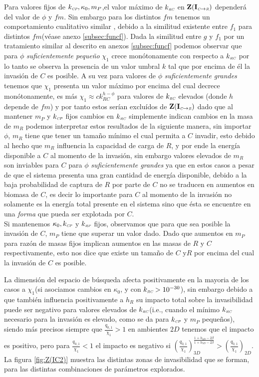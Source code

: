 Para valores fijos de $k_{\textit{\tiny CP}}, \kappa_0 ,m_P$,el valor m\'aximo de $k_{\textit{\tiny RC}}$ en $\mathbf{Z(I_{\textit{\tiny C}\to \textit{\tiny R}})}$ depender\'a del valor de $\phi$ y $fm$. Sin embargo para los distintos $fm$ tenemos un comportamiento cualitativo similar , debido a la similitud existente entre $f_1$ para distintos $fm$(v\'ease anexo \ref{subsec:funcf}). Dada la similitud entre $g$ y $f_1$ por un tratamiento similar al descrito en anexos \ref{subsec:funcf} podemos observar que para $\phi$ \emph{suficientemente peque\~no} $\chi_1$ crece mon\'otonamente con respecto a $k_{\textit{\tiny RC}}$ por lo tanto se observa la presencia de un valor umbral $k$ tal que por encima de \'el la invasi\'on de $C$ es posible. A su vez para valores de $\phi$ \emph{suficientemente grandes} tenemos que $\chi_1$ presenta un valor m\'aximo por encima del cual decrece mon\'otonamente, es m\'as $\chi_1 \approx c k_{RC}^{h - \phi}$ para valores de $k_{\textit{\tiny RC}}$ elevados (donde $h$ depende de $fm$) y por tanto estos ser\'ian exclu\'idos de $\mathbf{Z(I_{\textit{\tiny C}\to \textit{\tiny R}})}$ dado que al mantener $m_P$ y $k_{\textit{\tiny CP}}$ fijos cambios en $k_{\textit{\tiny RC}}$ simplemente indican cambios en la masa de $m_R$ podemos interpretar estos resultados de la siguiente manera, sin importar $\phi$, $m_R$ tiene que tener un tama\~no m\'inimo el cual permita a $C$ invadir, esto debido al hecho que $m_R$ influencia la capacidad de carga de $R$, y por ende la energ\'ia disponible a $C$ al momento de la invasi\'on, sin embargo valores elevados de $m_R$ son inviables para $C$ para $\phi$ \emph{suficientemente grandes} ya que en estos casos a pesar de que el sistema presenta una gran cantidad de energ\'ia disponible, debido a la baja probabilidad de captura de $R$ por parte de $C$ no se traducen en aumentos en biomasa de $C$, es decir lo importante para $C$ al momento de la invasi\'on no solamente es la energ\'ia total presente en el sistema sino que \'esta se encuentre en una \emph{forma} que pueda ser explotada por $C$.\\


Si mantenemos $\kappa_0,k_{\textit{\tiny CP}}$ y $k_{\textit{\tiny RP}}$ fijos, observamos que para que sea posible la invasi\'on de $C$, $m_P$ tiene que superar un valor dado. Dado que aumentos en $m_P$ para raz\'on de masas fijos implican aumentos en las masas de $R$ y $C$ respectivamente, esto nos dice que existe un tama\~no de $C$ y$R$ por encima del cual la invasi\'on de $C$ es posible.

La dimensi\'on del espacio de b\'usqueda afecta positivamente en la mayoria de los casos a $\chi_1$(si asociamos cambios en $\kappa_0$, y con $k_{\textit{\tiny RC}} > 10^{-30}$), sin embargo debido a que tambi\'en influencia positivamente a $h_R$ su impacto total sobre la invasibilidad puede ser negativo para valores elevados de $k_{\textit{\tiny RC}}$(i.e., cuando el m\'inimo $k_{\textit{\tiny RC}}$ necesario para la invasi\'on es elevado, como se da para $k_{\textit{\tiny CP}}$ y $m_P$ peque\~nos), siendo m\'as precisos siempre que $\frac{q_{0,1}}{\chi_1} >1$ en ambientes $2D$ tenemos que el impacto es positivo, pero para $\frac{q_{0,1}}{\chi_1} < 1$ el impacto es negativo si $ (\frac{q_{0,1}}{\chi_1})_{3D}^\frac{1 + h_{2D} - 2 \beta}{1 + h_{3D} - 2 \beta} >  (\frac{q_{0,1}}{\chi_1})_{2D} $.\\ La figura \ref{fig:Z(IC2)} muestra las distintas zonas de invasibilidad que se forman, para las distintas combinaciones de par\'ametros explorados.


